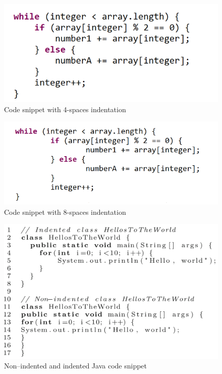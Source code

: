 \begin{figure} [H]
  \centering
  \includegraphics [scale=0.9]
  {figures/4.png}
  \caption{Code snippet with 4-spaces indentation \cite[p. 14]{bauer2017indentations}}
  \label{fig:AnhangsChor}
\end{figure}

\begin{figure} [H]
  \centering
  \includegraphics [scale=1]
  {figures/8.png}
  \caption{Code snippet with 8-spaces indentation \cite[p. 14]{bauer2017indentations}}
  \label{fig:AnhangsChor}
\end{figure}


\begin{figure} [H]
  \centering
  \includegraphics [scale=0.8]
  {figures/indentation_ex.png}
  \caption{Non–indented and indented Java code snippet \cite[p. 4]{hanenberg2024indentation}} 
  \label{fig:AnhangsChor}
\end{figure}


